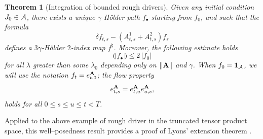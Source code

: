 \documentclass[11pt,a4paper]{amsart}
\renewcommand{\leq}{\leqslant}
\theoremstyle{plain}%
\newtheorem{theorem}{Theorem}
\theoremstyle{definition}
\theoremstyle{remark}
\numberwithin{equation}{section} %
\begin{document}
\begin{theorem}[Integration of bounded rough drivers]
\label{ThmIntegrationLinearBounded}
Given any initial condition $J_0\in\mathcal{A}$, there  exists a unique $\gamma$-H\"older path $f_\bullet$ starting from $f_0$, and such that the formula 
  \begin{equation*}
    \delta f_{t, s} - (A^1_{t, s} +A^2_{t, s}) f_s 
  \end{equation*}
defines a $3\gamma$-H\"older $2$-index map $f^\natural$. Moreover, the following estimate holds
  \begin{equation}
  \label{EqLinearBound}
    \llparenthesis\, f_\bullet \,\rrparenthesis \leqslant 2\,| f_0 |
  \end{equation}
for all $\lambda$ greater than some $\lambda_0$ depending only on $\| \bf A \|$ and $\gamma$. When $f_0  ={\bf 1}_{\mathcal{A}}$, we will use the notation $ f_t =e^{\bf A}_{t,0}$; the flow property
$$
e^{\bf A}_{t, s} = e^{\bf A}_{t, u} e^{\bf A}_{u, s},
$$
holds for all $0\leq s\leq u\leq t<T$.
\end{theorem}

\medskip

Applied to the above example of rough driver in the truncated tensor product space, this well--posedness result provides a proof of Lyons' extension theorem \cite{Lyons98}.

\medskip
\end{document}
